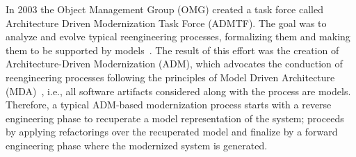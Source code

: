 




In 2003 the Object Management Group (OMG) created a task force called Architecture Driven Modernization Task Force (ADMTF). The goal was to analyze and evolve typical reengineering processes, formalizing them and making them to be supported by models~\cite{1686216}. The result of this effort was the creation of Architecture-Driven Modernization (ADM), which advocates the conduction of reengineering processes following the principles of Model Driven Architecture (MDA)~\cite{Heckel2008, Andrade:2005, Reus:2006}, i.e., all software artifacts considered along with the process are models. Therefore, a typical ADM-based modernization process starts with a reverse engineering phase to recuperate a model representation of the system; proceeds by applying refactorings over the recuperated model and finalize by a forward engineering phase where the modernized system is generated.

